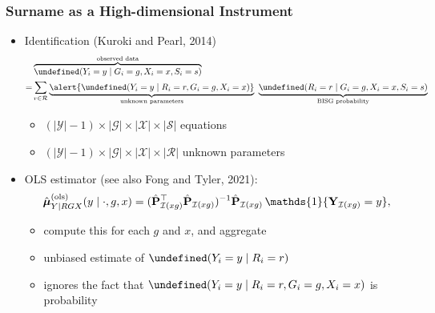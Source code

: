 \documentclass[handout]{beamer}
\let\Pr\undefined
\DeclareMathOperator{\Pr}{\mathbb{P}}
\newcommand{\ind}{\mathds{1}}
\newcommand{\cI}{\mathcal{I}}
\begin{document}
\begin{frame}

  \frametitle{Surname as a High-dimensional Instrument}

  \begin{itemize}
  \item Identification {\scriptsize (Kuroki and Pearl, 2014)}
    {\small\begin{align*}
     & \overbrace{\Pr(Y_i=y\mid G_i=g, X_i=x, S_i=s)}^{\text{observed data}} \\
    = & \sum_{r\in\mathcal{R}} \underbrace{\alert{\Pr(Y_i=y\mid R_i=r, G_i=g,
        X_i=x)}}_{\text{unknown parameters}}\ \underbrace{\Pr(R_i=r\mid
        G_i=g, X_i=x, S_i=s)}_{\text{BISG probability}}
           \end{align*}}
    \vspace{-.2in}
         \begin{itemize}
         \item $(|\mathcal{Y}|-1)\times|\mathcal{G}|\times|\mathcal{X}|\times|\mathcal{S}|$ equations
         \item
           $(|\mathcal{Y}|-1)\times|\mathcal{G}|\times|\mathcal{X}|\times|\mathcal{R}|$
           unknown parameters
         \end{itemize}
         \vfill
       \item OLS estimator {\scriptsize (see also Fong and Tyler, 2021)}:
         $$
    \hat{\vb*\mu}^{(\text{ols})}_{Y\mid RGX}(y\mid \cdot, g,x) 
    =  (\hat{\vb P}_{\cI(xg)}^\top \hat{\vb P}_{\cI(xg)})^{-1}\hat{\vb P}_{\cI(xg)}\,\ind\{{\vb Y}_{\cI(xg)} = y\},
    $$
    \vspace{-.2in}
    \begin{itemize}
    \item compute this for each $g$ and $x$, and aggregate
    \item unbiased estimate of $\Pr(Y_i= y \mid R_i = r)$
    \item ignores the fact that $\Pr(Y_i= y \mid R_i = r, G_i
      = g, X_i = x)$ is probability
  \end{itemize}
  \end{itemize}

\end{frame}
\end{document}
